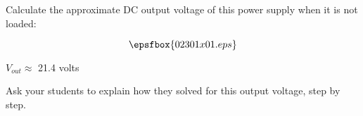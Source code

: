 

Calculate the approximate DC output voltage of this power supply when it is not loaded:

$$\epsfbox{02301x01.eps}$$







$V_{out} \approx$ 21.4 volts







Ask your students to explain how they solved for this output voltage, step by step.




